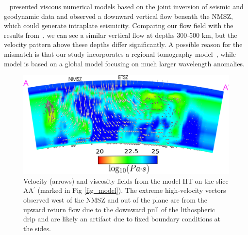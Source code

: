 \documentclass[draft,linenumbers]{agujournal2018}
\begin{document}
~\citet{forte2007descent} presented viscous numerical models based on the joint inversion of seismic and geodynamic data and observed a downward vertical flow beneath the NMSZ, which could generate intraplate seismicity. Comparing our flow field with the results from~\citet{forte2007descent}, we can see a similar vertical flow at depths 300-500 km, but the velocity pattern above these depths differ significantly. A possible reason for the mismatch is that our study incorporates a regional tomography model~\citep{Biryol_2016}, while~\citet{forte2007descent} model is based on a global model focusing on much larger wavelength anomalies.
%    
\begin{figure}[ht]
    \centering
    \includegraphics[width=0.9\linewidth]{figures/velocity_pattern.png}
    \caption{Velocity (arrows) and viscosity fields from the model HT on the slice AA$^{\prime}$ (marked in Fig \ref{fig_model}). The extreme high-velocity vectors observed west of the NMSZ and out of the plane are from the upward return flow due to the downward pull of the lithospheric drip and are likely an artifact due to fixed boundary conditions at the sides.}
    \label{velocity_pattern}
\end{figure}     
\end{document}
